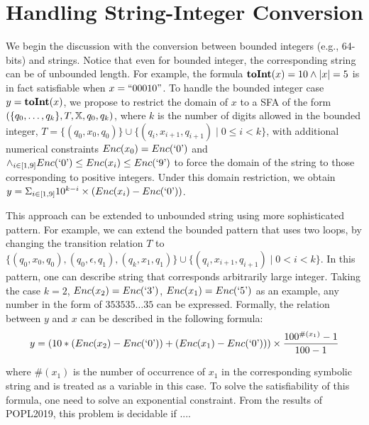 \documentclass{llncs}
\begin{document}
\section{Handling String-Integer Conversion} \label{section:s2i}
We begin the discussion with the conversion between bounded integers (e.g., 64-bits) and strings. Notice that even for bounded integer, the corresponding string can be of unbounded length. For example, the formula $\mbox{\textbf{toInt}($x$)}=10 \wedge |x|=5$ is in fact satisfiable when $x=``00010"$. To handle the bounded integer case $y=\mbox{\textbf{toInt}($x$)}$, we propose to restrict the domain of $x$ to a SFA of the form $(\{q_0,\ldots,q_k\},T,\mbox{$\mathbb{X}$}, q_0,q_k)$, where $k$ is the number of digits allowed in the bounded integer, $T = \{(q_0,x_0,q_0)\} \cup \{(q_i,x_{i+1},q_{i+1})\mid 0\leq i <k\}$, with additional numerical constraints $Enc(x_0)=Enc(\mbox{`0'})$ and $\wedge_{i\in [1,9]} Enc(\mbox{`0'})\leq Enc(x_i) \leq Enc(\mbox{`9'})$ to force the domain of the string to those corresponding to positive integers. Under this domain restriction, we obtain $y=\Sigma_{i\in [1,9]} 10^{k-i}\times (Enc(x_i)-Enc(\mbox{`0'}))$.


This approach can be extended to unbounded string using more sophisticated pattern. For example, we can extend the bounded pattern that uses two loops, by changing the transition relation $T$ to $\{(q_0,x_0,q_0), (q_0,\epsilon,q_1), (q_k,x_1,q_1)\} \cup \{(q_i,x_{i+1},q_{i+1})\mid 0< i <k\}$. In this pattern, one can describe string that corresponds arbitrarily large integer. Taking the case $k=2$, $Enc(x_2)=Enc(\mbox{`3'})$, $Enc(x_1)=Enc(\mbox{`5'})$ as an example, any number in the form of $353535\ldots35$ can be expressed. Formally, the relation between $y$ and $x$ can be described in the following formula:
$$y= (10*(Enc(x_2)-Enc(\mbox{`0'}))+(Enc(x_1)-Enc(\mbox{`0'})))\times \frac{100^{\#(x_1)}-1}{100-1}$$

where $\#(x_1)$ is the number of occurrence of $x_1$ in the corresponding symbolic string and is treated as a variable in this case. To solve the satisfiability of this formula, one need to solve an exponential constraint. From the results of POPL2019, this problem is decidable if ....
\end{document}
